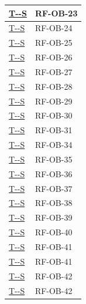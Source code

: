 \documentclass[a4paper,12pt]{article}
\newcounter{testsys}
\newcommand{\systestref}{%
  \hyperlink{T-\arabic{testsys}-S}{T-\arabic{testsys}-S}%
}
\begin{document}
\begin{center}
\begin{longtable}{|>{\centering\arraybackslash}p{5cm}|>{\centering\arraybackslash}p{9cm}|}
\stepcounter{testsys}
\systestref & RF-OB-23 \\
\hline

\stepcounter{testsys}
\systestref & RF-OB-24 \\
\hline

\stepcounter{testsys}
\systestref & RF-OB-25 \\
\hline

\stepcounter{testsys}
\systestref & RF-OB-26 \\
\hline

\stepcounter{testsys}
\systestref & RF-OB-27 \\
\hline

\stepcounter{testsys}
\systestref & RF-OB-28 \\
\hline

\stepcounter{testsys}
\systestref & RF-OB-29 \\
\hline

\stepcounter{testsys}
\systestref & RF-OB-30 \\
\hline

\stepcounter{testsys}
\systestref & RF-OB-31 \\
\hline

\stepcounter{testsys}
\systestref & RF-OB-34 \\
\hline

\stepcounter{testsys}
\systestref & RF-OB-35 \\
\hline

\stepcounter{testsys}
\systestref & RF-OB-36 \\
\hline

\stepcounter{testsys}
\systestref & RF-OB-37 \\
\hline

\stepcounter{testsys}
\systestref & RF-OB-38 \\
\hline

\stepcounter{testsys}
\systestref & RF-OB-39 \\
\hline

\stepcounter{testsys}
\systestref & RF-OB-40 \\
\hline

\stepcounter{testsys}
\systestref & RF-OB-41 \\
\hline

\stepcounter{testsys}
\systestref & RF-OB-41 \\
\hline

\stepcounter{testsys}
\systestref & RF-OB-42 \\
\hline

\stepcounter{testsys}
\systestref & RF-OB-42 \\
\hline


\end{longtable}
\end{center}
\end{document}
